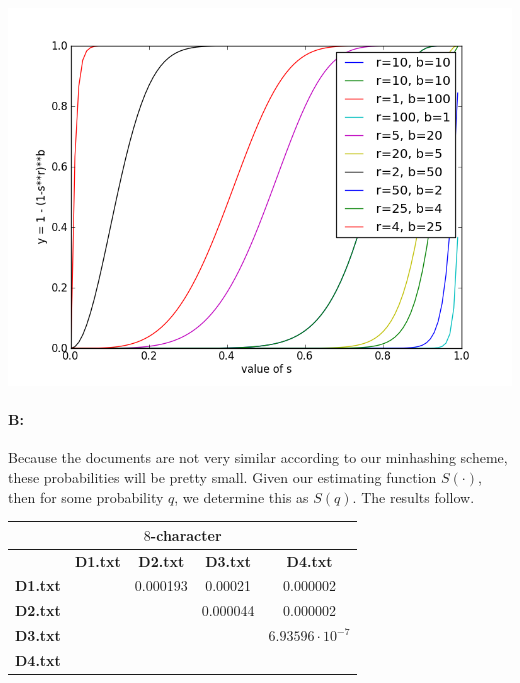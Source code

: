 \documentclass[11pt]{article}
\begin{document}
\begin{center}
\includegraphics[scale=0.5]{plot.png}
\end{center}

\paragraph*{B:} Because the documents are not very similar according to our minhashing scheme, these probabilities will be pretty small. Given our estimating function $S(\cdot)$, then for some probability $q$, we determine this as $S(q)$. The results follow.

\begin{center}

\begin{tabular}{| c || c | c | c | c |}
\hline
\multicolumn{5}{|c|}{$8$-character} \\
\hline
& \textbf{D1.txt} & \textbf{D2.txt}  & \textbf{D3.txt}  & \textbf{D4.txt} \\
\hline
\hline
\textbf{D1.txt} &  & 0.000193 & 0.00021 & 0.000002 \\
\hline
\textbf{D2.txt} &  & & 0.000044 & 0.000002 \\
\hline
\textbf{D3.txt} &  &  &  & $6.93596 \cdot 10^{-7}$ \\
\hline
\textbf{D4.txt} &  &  &  &  \\
\hline
\end{tabular}

\end{center}
\end{document}
